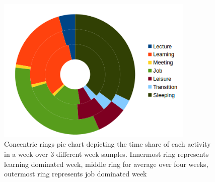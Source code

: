 \documentclass[conference]{IEEEtran}
\begin{document}
\begin{figure}[hb]
  \centering
  \includegraphics[width=3.7in]{donut}
  \caption[]
   {Concentric rings pie chart depicting the time share of each activity in a week over 3 different week samples. Innermost ring represents learning dominated week, middle ring for average over four weeks, outermost ring represents job dominated week}
\end{figure}
\end{document}
